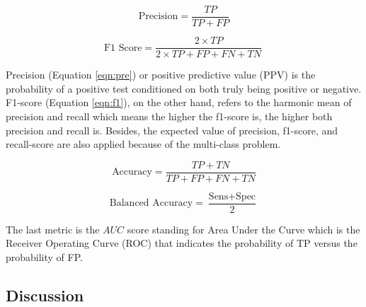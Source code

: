 \documentclass[sensors,article,submit,pdftex,moreauthors]{Definitions/mdpi}
\begin{document}
	\begin{equation}
		\label{eqn:pre}
		\text{Precision} = \frac{TP}{TP + FP}
	\end{equation}
	
	\begin{equation}
		\label{eqn:f1}
		\text{F1 Score} = \frac{2 \times TP}{2 \times TP + FP + FN + TN}\
	\end{equation}
	
	Precision (Equation \ref{eqn:pre}) or positive predictive value (PPV) is the probability of a positive test conditioned on both truly being positive or negative. F1-score (Equation \ref{eqn:f1}), on the other hand, refers to the harmonic mean of precision and recall which means the higher the f1-score is, the higher both precision and recall is. Besides, the expected value of precision, f1-score, and recall-score are also applied because of the multi-class problem.
	
	\begin{equation}
		\label{eqn:acc}
		\text{Accuracy} = \frac{TP + TN}{TP + FP + FN + TN}
	\end{equation}
	
	\begin{equation}
		\label{eqn:balacc}
		\text{Balanced Accuracy} = \frac{\text{Sens} + \text{Spec}}{2}
	\end{equation}
	
	The last metric is the $AUC$ score standing for Area Under the Curve which is the Receiver Operating Curve (ROC) that indicates the probability of TP versus the probability of FP.  
	
	\subsection{Discussion} 

	
\end{document}
